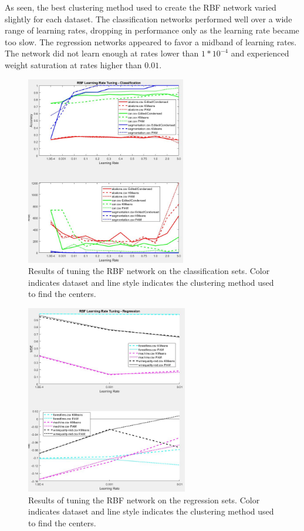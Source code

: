 \documentclass[twoside,10pt]{article}
\begin{document}
As seen, the best clustering method used to create the RBF network varied slightly for each dataset. The classification networks performed well over a wide range of learning rates, dropping in performance only as the learning rate became too slow. The regression networks appeared to favor a midband of learning rates. The network did not learn enough at rates lower than $1*10^{-4}$ and experienced weight saturation at rates higher than $0.01$.
\begin{figure}[h]
	\centering
	\includegraphics[height=3.25in]{FINAL_FIGS/RBF_LR_TUNING_CLASS.JPG}
	\caption{Results of tuning the RBF network on the classification sets. Color indicates dataset and line style indicates the clustering method used to find the centers.}
\end{figure}
\begin{figure}[h]
	\centering
	\includegraphics[height=3.25in]{FINAL_FIGS/RBF_LR_TUNING_REG.JPG}
	\caption{Results of tuning the RBF network on the regression sets. Color indicates dataset and line style indicates the clustering method used to find the centers.}
\end{figure}
\end{document}
